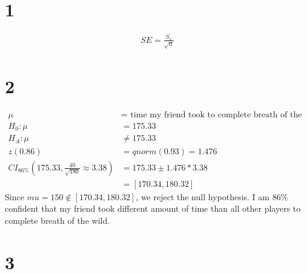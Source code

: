 \documentclass{article}
\begin{document}
\section*{1}
\begin{align*}
	SE = \frac{S_x}{\sqrt{n}}
\end{align*}

\section*{2}
\begin{align*}
\mu &= \text{ time my friend took to complete breath of the wild}\\
H_0: \mu &= 175.33\\
H_A: \mu &\neq 175.33\\
z(0.86) &= qnorm(0.93) = 1.476\\
CI_{86\%}(175.33, \frac{40}{\sqrt{180}}\approx 3.38) &= 175.33 \pm 1.476 *
3.38\\
&= [170.34, 180.32]
\end{align*}
Since $mu = 150 \not\in [170.34, 180.32]$, we reject the null hypothesis. I am
86\% confident that my friend took different amount of time than all other
players to complete breath of the wild.

\section*{3}
\end{document}

